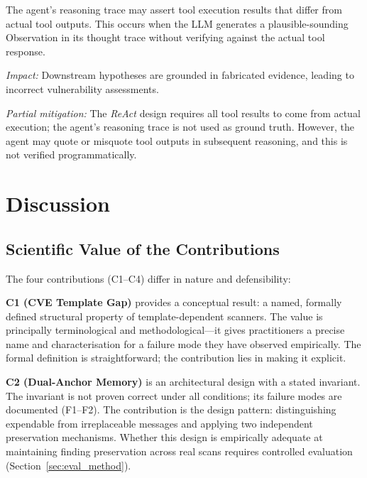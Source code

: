 \documentclass[12pt, a4paper, oneside, openany]{book}
\begin{document}
\begin{limitbox}
The agent's reasoning trace may assert tool execution results that
differ from actual tool outputs.  This occurs when the LLM
generates a plausible-sounding Observation in its thought trace
without verifying against the actual tool response.

\textit{Impact:} Downstream hypotheses are grounded in fabricated
evidence, leading to incorrect vulnerability assessments.

\textit{Partial mitigation:} The \textit{ReAct} design requires
all tool results to come from actual execution; the agent's
reasoning trace is not used as ground truth.  However, the agent
may quote or misquote tool outputs in subsequent reasoning,
and this is not verified programmatically.
\end{limitbox}



\chapter{Discussion}
\label{chap:discussion}

\section{Scientific Value of the Contributions}

The four contributions (C1--C4) differ in nature and defensibility:

\textbf{C1 (CVE Template Gap)} provides a conceptual result: a named,
formally defined structural property of template-dependent scanners.
The value is principally terminological and methodological---it gives
practitioners a precise name and characterisation for a failure mode
they have observed empirically.  The formal definition is
straightforward; the contribution lies in making it explicit.

\textbf{C2 (Dual-Anchor Memory)} is an architectural design with a
stated invariant.  The invariant is not proven correct under all
conditions; its failure modes are documented (F1--F2).  The
contribution is the design pattern: distinguishing expendable from
irreplaceable messages and applying two independent preservation
mechanisms.  Whether this design is empirically adequate at
maintaining finding preservation across real scans requires
controlled evaluation (Section~\ref{sec:eval_method}).
\end{document}
